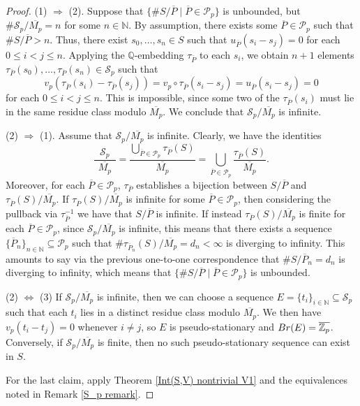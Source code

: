\documentclass{article}
\theoremstyle{definition}\newtheorem{Def}[equation]{Definition}
\theoremstyle{definition}\newtheorem{Ques}[equation]{Question}
\theoremstyle{definition}\newtheorem{Conj}[equation]{Conjecture}
\theoremstyle{definition}\newtheorem{Not}[equation]{Notation}
\newcommand{\N}{\mathbb{N}}
\newcommand{\Q}{\mathbb{Q}}
\newcommand{\oP}{\overline{P}}
\newcommand{\Z}{\mathbb{Z}}
\newcommand{\oZp}{\overline{\Z_p}}
\newcommand{\oMp}{\overline{M_p}}
\newcommand{\Br}{\textnormal{Br}}
\numberwithin{equation}{section}
\begin{document}
\begin{proof} 

(1) $\Rightarrow$ (2). Suppose that $\{\# S/\oP\mid\oP\in \mathcal{P}_p\}$ is unbounded, but $\# \mathcal{S}_p/\oMp = n$ for some $n \in \N$. By assumption, there exists some $\oP \in\mathcal P_p$ such that $\#S/\oP > n$. Thus, there exist $s_0,\ldots,s_n\in S$ such that $u_{\oP}(s_i-s_j)=0$ for each $0\leq i<j\leq n$. Applying the $\Q$-embedding $\tau_{\oP}$ to each $s_i$, we obtain $n+1$ elements $\tau_{\oP}(s_0), \ldots, \tau_{\oP}(s_n) \in \mathcal{S}_p$ such that 
\begin{equation*}
v_p(\tau_{\oP}(s_i)-\tau_{\oP}(s_j)) = v_p\circ\tau_{\oP}(s_i-s_j) = u_{\oP}(s_i-s_j)=0
\end{equation*}
for each $0\leq i<j\leq n$. This is impossible, since some two of the $\tau_{\oP}(s_i)$ must lie in the same residue class modulo $\oMp$.  We conclude that $\mathcal{S}_p/\oMp$ is infinite.

(2) $\Rightarrow$ (1). Assume that $\mathcal{S}_p/\oMp$ is infinite. Clearly, we have the identities
$$\frac{\phantom{x}\mathcal{S}_p\phantom{x}}{\oMp}=\frac{\bigcup_{\oP\in\mathcal{P}_p}\tau_{\oP}(S)}{\oMp}=\bigcup_{\oP\in\mathcal{P}_p}\frac{\tau_{\oP}(S)}{\oMp}.$$
Moreover, for each $\oP\in\mathcal{P}_p$, $\tau_{\oP}$ establishes a bijection between $S/\oP$ and $\tau_{\oP}(S)/\oMp$. If $\tau_{\oP}(S)/\oMp$ is infinite for some $\oP\in\mathcal{P}_p$, then considering the pullback via $\tau_{\oP}^{-1}$ we have that $S/\oP$ is infinite. If instead $\tau_{\oP}(S)/\oMp$ is finite for each $\oP\in\mathcal{P}_p$, since $\mathcal{S}_p/\oMp$ is infinite, this means that there exists a sequence $\{\oP_n\}_{n\in\N}\subseteq\mathcal{P}_p$ such that $\#\tau_{\oP_n}(S)/\oMp=d_n<\infty$ is diverging to infinity. This amounts to say via the previous one-to-one correspondence that $\#S/\oP_n=d_n$ is diverging to infinity, which means that $\{\# S/\oP\mid\oP\in \mathcal{P}_p\}$ is unbounded.



(2) $\Leftrightarrow$ (3) If $\mathcal{S}_p/\oMp$ is infinite, then we can choose a sequence $E = \{t_i\}_{i \in \N} \subseteq \mathcal{S}_p$ such that each $t_i$ lies in a distinct residue class modulo $\oMp$. We then have $v_p(t_i - t_j) = 0$ whenever $i \ne j$, so $E$ is pseudo-stationary and $\Br(E) = \oZp$. Conversely, if $\mathcal{S}_p/\oMp$ is finite, then no such pseudo-stationary sequence can exist in $S$.

For the last claim, apply Theorem \ref{Int(S,V) nontrivial V1} and the equivalences noted in Remark \ref{S_p remark}.
\end{proof}
\end{document}

